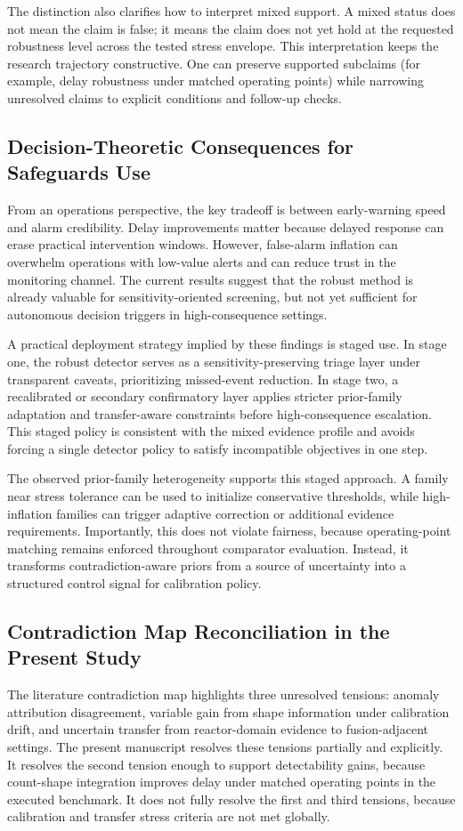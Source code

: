 The distinction also clarifies how to interpret mixed support. A mixed status does not mean the claim is false; it means the claim does not yet hold at the requested robustness level across the tested stress envelope. This interpretation keeps the research trajectory constructive. One can preserve supported subclaims (for example, delay robustness under matched operating points) while narrowing unresolved claims to explicit conditions and follow-up checks.

\subsection{Decision-Theoretic Consequences for Safeguards Use}
From an operations perspective, the key tradeoff is between early-warning speed and alarm credibility. Delay improvements matter because delayed response can erase practical intervention windows. However, false-alarm inflation can overwhelm operations with low-value alerts and can reduce trust in the monitoring channel. The current results suggest that the robust method is already valuable for sensitivity-oriented screening, but not yet sufficient for autonomous decision triggers in high-consequence settings.

A practical deployment strategy implied by these findings is staged use. In stage one, the robust detector serves as a sensitivity-preserving triage layer under transparent caveats, prioritizing missed-event reduction. In stage two, a recalibrated or secondary confirmatory layer applies stricter prior-family adaptation and transfer-aware constraints before high-consequence escalation. This staged policy is consistent with the mixed evidence profile and avoids forcing a single detector policy to satisfy incompatible objectives in one step.

The observed prior-family heterogeneity supports this staged approach. A family near stress tolerance can be used to initialize conservative thresholds, while high-inflation families can trigger adaptive correction or additional evidence requirements. Importantly, this does not violate fairness, because operating-point matching remains enforced throughout comparator evaluation. Instead, it transforms contradiction-aware priors from a source of uncertainty into a structured control signal for calibration policy.

\subsection{Contradiction Map Reconciliation in the Present Study}
The literature contradiction map highlights three unresolved tensions: anomaly attribution disagreement, variable gain from shape information under calibration drift, and uncertain transfer from reactor-domain evidence to fusion-adjacent settings. The present manuscript resolves these tensions partially and explicitly. It resolves the second tension enough to support detectability gains, because count-shape integration improves delay under matched operating points in the executed benchmark. It does not fully resolve the first and third tensions, because calibration and transfer stress criteria are not met globally.

